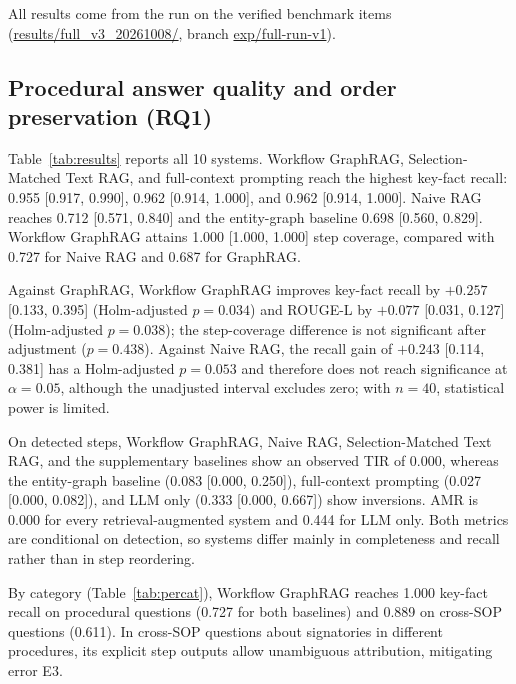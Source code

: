 \documentclass[preprint,10pt]{elsarticle}
\begin{document}
All results come from the run on the \nVerified{} verified benchmark items (\url{results/full_v3_20261008/}, branch \url{exp/full-run-v1}).

\subsection{Procedural answer quality and order preservation (RQ1)}
Table~\ref{tab:results} reports all 10 systems. Workflow GraphRAG, Selection-Matched Text RAG, and full-context prompting reach the highest key-fact recall: 0.955 [0.917, 0.990], 0.962 [0.914, 1.000], and 0.962 [0.914, 1.000]. Naive RAG reaches 0.712 [0.571, 0.840] and the entity-graph baseline 0.698 [0.560, 0.829]. Workflow GraphRAG attains 1.000 [1.000, 1.000] step coverage, compared with 0.727 for Naive RAG and 0.687 for GraphRAG.

\begin{table}[!htbp]
\centering
\caption{Summary of evaluation results across ten system configurations. KFR and false refusal: 35 answerable questions; Coverage, TIR, and AMR: 11 procedural questions; refusal accuracy: 5 unanswerable questions; prompt tokens: all 40. Point estimates; 95\% confidence intervals are in Supplementary Table~S1.}
\label{tab:results}
\small
\setlength{\tabcolsep}{2pt}
\resizebox{\textwidth}{!}{%
}
\end{table}

Against GraphRAG, Workflow GraphRAG improves key-fact recall by $+0.257$ [0.133, 0.395] (Holm-adjusted $p=0.034$) and ROUGE-L by $+0.077$ [0.031, 0.127] (Holm-adjusted $p=0.038$); the step-coverage difference is not significant after adjustment ($p=0.438$). Against Naive RAG, the recall gain of $+0.243$ [0.114, 0.381] has a Holm-adjusted $p=0.053$ and therefore does not reach significance at $\alpha=0.05$, although the unadjusted interval excludes zero; with $n=40$, statistical power is limited.

On detected steps, Workflow GraphRAG, Naive RAG, Selection-Matched Text RAG, and the supplementary baselines show an observed TIR of 0.000, whereas the entity-graph baseline (0.083 [0.000, 0.250]), full-context prompting (0.027 [0.000, 0.082]), and LLM only (0.333 [0.000, 0.667]) show inversions. AMR is 0.000 for every retrieval-augmented system and 0.444 for LLM only. Both metrics are conditional on detection, so systems differ mainly in completeness and recall rather than in step reordering.

By category (Table~\ref{tab:percat}), Workflow GraphRAG reaches 1.000 key-fact recall on procedural questions (0.727 for both baselines) and 0.889 on cross-SOP questions (0.611). In cross-SOP questions about signatories in different procedures, its explicit step outputs allow unambiguous attribution, mitigating error E3.
\end{document}
